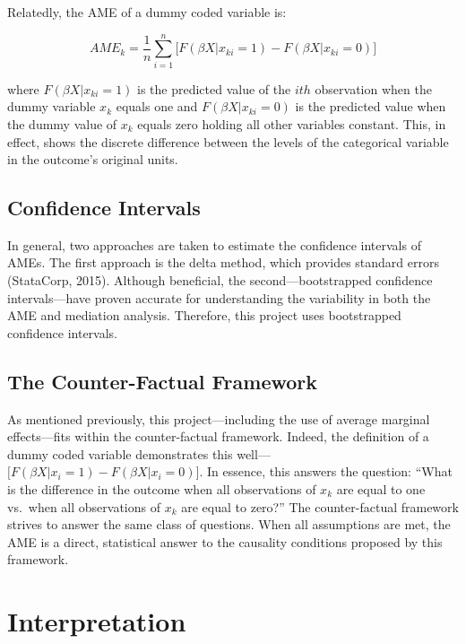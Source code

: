 \documentclass[]{DissertateUSU}
\begin{document}
Relatedly, the AME of a dummy coded variable is:

\begin{equation}
AME_{k} = \frac{1}{n} \sum_{i=1}^{n} \big[ F(\beta X | x_{ki} = 1) - F(\beta X | x_{ki} = 0) \big]
\end{equation}

\noindent where \(F(\beta X | x_{ki} = 1)\) is the predicted value of
the \(ith\) observation when the dummy variable \(x_k\) equals one and
\(F(\beta X | x_{ki} = 0)\) is the predicted value when the dummy value
of \(x_k\) equals zero holding all other variables constant. This, in
effect, shows the discrete difference between the levels of the
categorical variable in the outcome's original units.

\subsection{Confidence Intervals}\label{confidence-intervals}

In general, two approaches are taken to estimate the confidence
intervals of AMEs. The first approach is the delta method, which
provides standard errors (StataCorp, 2015). Although beneficial, the
second---bootstrapped confidence intervals---have proven accurate for
understanding the variability in both the AME and mediation analysis.
Therefore, this project uses bootstrapped confidence intervals.

\subsection{The Counter-Factual
Framework}\label{the-counter-factual-framework}

As mentioned previously, this project---including the use of average
marginal effects---fits within the counter-factual framework. Indeed,
the definition of a dummy coded variable demonstrates this
well---\(\big[ F(\beta X | x_i = 1) - F(\beta X | x_i = 0) \big]\). In
essence, this answers the question: ``What is the difference in the
outcome when all observations of \(x_k\) are equal to one vs.~when all
observations of \(x_k\) are equal to zero?'' The counter-factual
framework strives to answer the same class of questions. When all
assumptions are met, the AME is a direct, statistical answer to the
causality conditions proposed by this framework.

\section{Interpretation}\label{interpretation}
\end{document}
